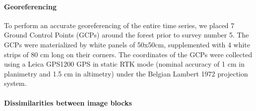 \documentclass[remotesensing,article,submit,moreauthors,pdftex,12pt,a4paper]{mdpi} %
\begin{document}
\paragraph{Georeferencing}

To perform an accurate georeferencing of the entire time series, we placed 7 Ground Control Points (GCPs) around the forest prior to survey number 5. 
The GCPs were materialized by white panels of 50x50cm, supplemented with 4 white strips of 80 cm long on their corners. 
The coordinates of the GCPs were collected using a Leica GPS1200 GPS in static RTK mode (nominal accuracy of 1 cm in planimetry and 1.5 cm in altimetry) under the Belgian Lambert 1972 projection system.

\paragraph{Dissimilarities between image blocks}
\end{document}
